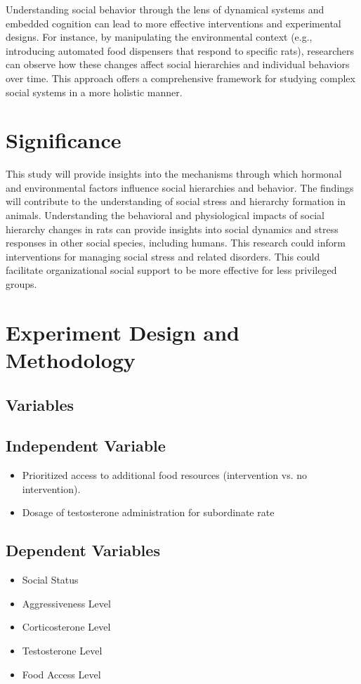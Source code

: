 \documentclass[english, a4paper, 11pt]{article}
\begin{document}
Understanding social behavior through the lens of dynamical systems and embedded cognition can lead to more effective interventions and experimental designs. For instance, by manipulating the environmental context (e.g., introducing automated food dispensers that respond to specific rats), researchers can observe how these changes affect social hierarchies and individual behaviors over time. This approach offers a comprehensive framework for studying complex social systems in a more holistic manner.




\section{Significance}
This study will provide insights into the mechanisms through which hormonal and environmental factors influence social hierarchies and behavior. The findings will contribute to the understanding of social stress and hierarchy formation in animals.
Understanding the behavioral and physiological impacts of social hierarchy changes in rats can provide insights into social dynamics and stress responses in other social species, including humans. This research could inform interventions for managing social stress and related disorders. This could facilitate organizational social support to be more effective for less privileged groups.  

\section{Experiment Design and Methodology}
\subsection*{Variables}

\subsection*{Independent Variable}
\begin{itemize}
    \item Prioritized access to additional food resources (intervention vs. no intervention).
    \item Dosage of testosterone administration for subordinate rate
\end{itemize}

\subsection*{Dependent Variables}
\begin{itemize}
    \item Social Status
    \item Aggressiveness Level
    \item Corticosterone Level
    \item Testosterone Level
    \item Food Access Level
\end{itemize}
\end{document}
